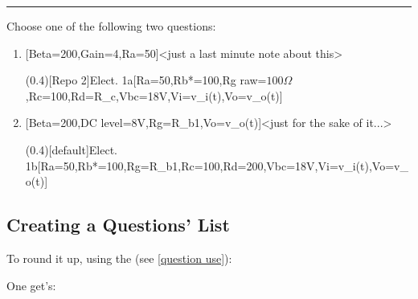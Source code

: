 \documentclass[10pt]{article}
\begin{document}

\hrule\relax\vspace{0.5ex}

Choose one of the following two questions:

\begin{enumerate}
  \item {}[Beta=200,Gain=4,Ra=50\Omega]<just a last minute note about this>\par
  \ftikzQuestion(0.4)[Repo 2]{Elect. 1a}[Ra=50\Omega,Rb*=100\Omega,Rg raw=$100\Omega$,Rc=100\Omega,Rd=R_c,Vbc=18V,Vi=v_i(t),Vo=v_o(t)]
  
  \item {}[Beta=200,DC level=8V,Rg=R_{b1},Vo=v_o(t)]<just for the sake of it...>\par
  \ftikzQuestion(0.4)[default]{Elect. 1b}[Ra=50\Omega,Rb*=100\Omega,Rg=R_{b1},Rc=100\Omega,Rd=200\Omega,Vbc=18V,Vi=v_i(t),Vo=v_o(t)]
\end{enumerate}

\subsection{Creating a Questions' List}
To round it up, using the \tsobj{\QuestionsList} (see \ref{question use}):
\begin{codestore}[Qlist]
\QuestionsList
\end{codestore}


One get's: 

\QuestionsList
\end{document}
